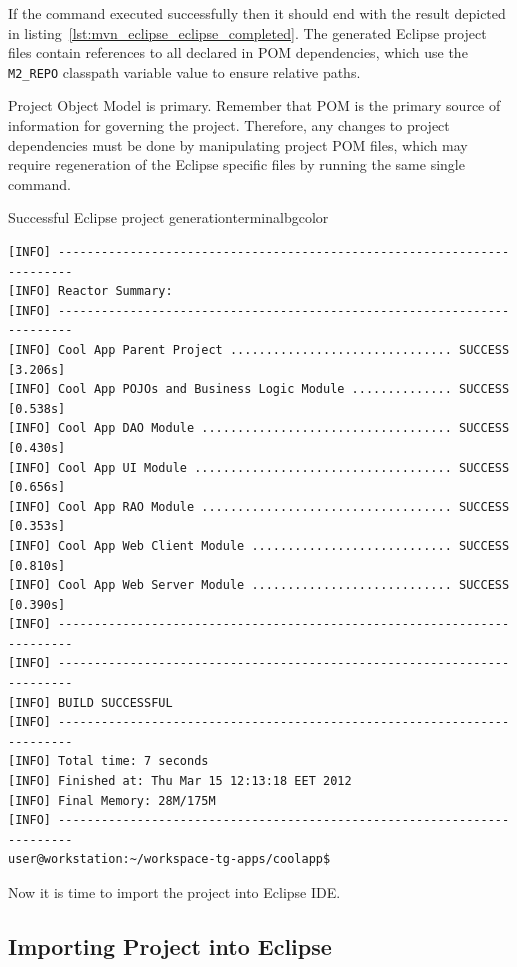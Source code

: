   If the command executed successfully then it should end with the result depicted in listing~\ref{lst:mvn_eclipse_eclipse_completed}. 
  The generated Eclipse project files contain references to all declared in POM dependencies, which use the \texttt{M2\_REPO} classpath variable value to ensure relative paths.

  \begin{notebox}{Project Object Model is primary.}{\label{mb:maven_primary}}
    Remember that POM is the primary source of information for governing the project.
    Therefore, any changes to project dependencies must be done by manipulating project POM files, which may require regeneration of the Eclipse specific files by running the same single command.
  \end{notebox}
  
  \begin{code}{Successful Eclipse project generation}{\label{lst:mvn_eclipse_eclipse_completed}}{terminalbgcolor}
      \begin{lstlisting}
[INFO] ------------------------------------------------------------------------
[INFO] Reactor Summary:
[INFO] ------------------------------------------------------------------------
[INFO] Cool App Parent Project ............................... SUCCESS [3.206s]
[INFO] Cool App POJOs and Business Logic Module .............. SUCCESS [0.538s]
[INFO] Cool App DAO Module ................................... SUCCESS [0.430s]
[INFO] Cool App UI Module .................................... SUCCESS [0.656s]
[INFO] Cool App RAO Module ................................... SUCCESS [0.353s]
[INFO] Cool App Web Client Module ............................ SUCCESS [0.810s]
[INFO] Cool App Web Server Module ............................ SUCCESS [0.390s]
[INFO] ------------------------------------------------------------------------
[INFO] ------------------------------------------------------------------------
[INFO] BUILD SUCCESSFUL
[INFO] ------------------------------------------------------------------------
[INFO] Total time: 7 seconds
[INFO] Finished at: Thu Mar 15 12:13:18 EET 2012
[INFO] Final Memory: 28M/175M
[INFO] ------------------------------------------------------------------------
user@workstation:~/workspace-tg-apps/coolapp$ 
      \end{lstlisting}
  \end{code}

  Now it is time to import the project into Eclipse IDE.

\subsection{Importing Project into Eclipse}


